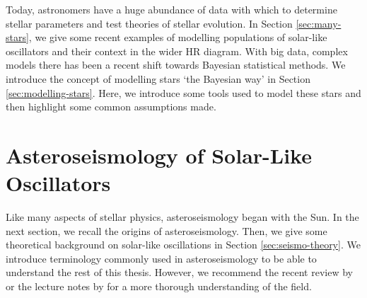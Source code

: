 
Today, astronomers have a huge abundance of data with which to determine stellar parameters and test theories of stellar evolution. In Section \ref{sec:many-stars}, we give some recent examples of modelling populations of solar-like oscillators and their context in the wider HR diagram. With big data, complex models there has been a recent shift towards Bayesian statistical methods. We introduce the concept of modelling stars `the Bayesian way' in Section \ref{sec:modelling-stars}. Here, we introduce some tools used to model these stars and then highlight some common assumptions made.





\section[Solar-Like Oscillators]{Asteroseismology of Solar-Like Oscillators}\label{sec:seismo}

Like many aspects of stellar physics, asteroseismology began with the Sun. In the next section, we recall the origins of asteroseismology. Then, we give some theoretical background on solar-like oscillations in Section \ref{sec:seismo-theory}. We introduce terminology commonly used in asteroseismology to be able to understand the rest of this thesis. However, we recommend the recent review by \citet{Aerts2021} or the lecture notes by \citet{Christensen-Dalsgaard2014} for a more thorough understanding of the field.

